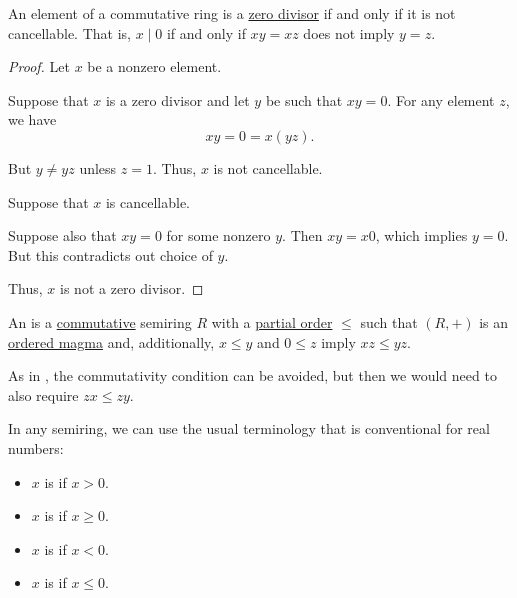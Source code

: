 \begin{proposition}\label{thm:semiring_cancellative_iff_no_zero_divisors}
  An element of a commutative ring is a \hyperref[def:semiring_division]{zero divisor} if and only if it is not cancellable. That is, \( x \mid 0 \) if and only if \( xy = xz \) does not imply \( y = z \).
\end{proposition}
\begin{proof}
  Let \( x \) be a nonzero element.

  \SufficiencySubProof Suppose that \( x \) is a zero divisor and let \( y \) be such that \( xy = 0 \). For any element \( z \), we have
  \begin{equation*}
    xy = 0 = x(yz).
  \end{equation*}

  But \( y \neq yz \) unless \( z = 1 \). Thus, \( x \) is not cancellable.

  \NecessitySubProof Suppose that \( x \) is cancellable.

  Suppose also that \( xy = 0 \) for some nonzero \( y \). Then \( xy = x0 \), which implies \( y = 0 \). But this contradicts out choice of \( y \).

  Thus, \( x \) is not a zero divisor.
\end{proof}

\begin{definition}\label{def:ordered_semiring}
  An  is a \hyperref[def:magma/commutative]{commutative} semiring \( R \) with a \hyperref[def:partially_ordered_set]{partial order} \( \leq \) such that \( (R, +) \) is an \hyperref[def:ordered_magma]{ordered magma} and, additionally, \( x \leq y \) and \( 0 \leq z \) imply \( xz \leq yz \).

  As in , the commutativity condition can be avoided, but then we would need to also require \( zx \leq zy \).

  In any semiring, we can use the usual terminology that is conventional for real numbers:
  \begin{itemize}
    \item \( x \) is  if \( x > 0 \).
    \item \( x \) is  if \( x \geq 0 \).
    \item \( x \) is  if \( x < 0 \).
    \item \( x \) is  if \( x \leq 0 \).
  \end{itemize}
\end{definition}

